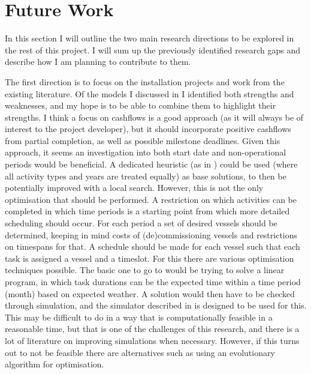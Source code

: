 \documentclass[a4paper,12pt]{article}
\begin{document}
\section{Future Work} \label{s:concl}
In this section I will outline the two main research directions to be explored in the rest of this project. I will sum up the previously identified research gaps and describe how I am planning to contribute to them. 

\bigskip

The first direction is to focus on the installation projects and work from the existing literature. Of the models I discussed in  I identified both strengths and weaknesses, and my hope is to be able to combine them to highlight their strengths. I think a focus on cashflows is a good approach (as it will always be of interest to the project developer), but it should incorporate positive cashflows from partial completion, as well as possible milestone deadlines. Given this approach, it seems an investigation into both start date and non-operational periods would be beneficial. A dedicated heuristic (as in \cite{kerkhove2017optimised}) could be used (where all activity types and years are treated equally) as base solutions, to then be potentially improved with a local search. However, this is not the only optimisation that should be performed. A restriction on which activities can be completed in which time periods is a starting point from which more detailed scheduling should occur. For each period a set of desired vessels should be determined, keeping in mind costs of (de)commissioning vessels and restrictions on timespans for that. A schedule should be made for each vessel such that each task is assigned a vessel and a timeslot. For this there are various optimisation techniques possible. The basic one to go to would be trying to solve a linear program, in which task durations can be the expected time within a time period (month) based on expected weather. A solution would then have to be checked through simulation, and the simulator described in  is designed to be used for this. This may be difficult to do in a way that is computationally feasible in a reasonable time, but that is one of the challenges of this research, and there is a lot of literature on improving simulations when necessary. However, if this turns out to not be feasible there are alternatives such as using an evolutionary algorithm for optimisation. 
\end{document}
